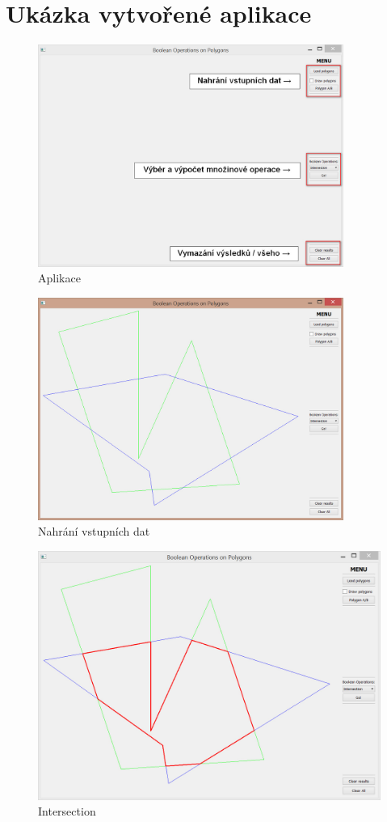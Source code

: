 \documentclass[a4paper, 12pt]{article}
\begin{document}
\section{Ukázka vytvořené aplikace}
\begin{figure}[h]
	\centering
	\includegraphics[width=10cm]{ap.jpg}
	\caption{Aplikace}
\end{figure}

\begin{figure}[h]
	\centering
	\includegraphics[width=10cm]{vstup.jpg}
	\caption{Nahrání vstupních dat}
\end{figure}

\begin{figure}[h]
	\centering
	\includegraphics[width=12cm]{inter.jpg}
	\caption{Intersection}
\end{figure}
\end{document}

